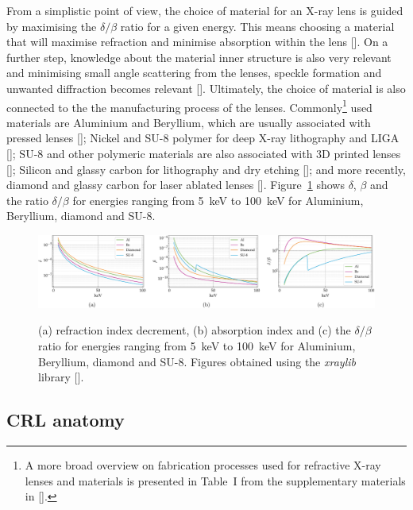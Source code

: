 \begin{refsection}
From a simplistic point of view, the choice of material for an X-ray lens is guided by maximising the $\delta/\beta$ ratio for a given energy. This means choosing a material that will maximise refraction and minimise absorption within the lens [\cite{Serebrennikov2016, Roth2017}]. On a further step, knowledge about the material inner structure is also very relevant and minimising small angle scattering from the lenses, speckle formation and unwanted diffraction becomes relevant [\citeauthor{Roth2014,Chubar2020,Lyatun2020}]. Ultimately, the choice of material is also connected to the the manufacturing process of the lenses. Commonly\footnote{A more broad overview on fabrication processes used for refractive X-ray lenses and materials is presented in Table~I from the supplementary materials in [\cite{Roth2017}].} used materials are Aluminium and Beryllium, which are usually associated with pressed lenses [\cite{refBe,refAl}]; Nickel and SU-8 polymer for deep X-ray lithography and LIGA [\cite{refLIGA}]; SU-8 and other polymeric materials are also associated with 3D printed lenses [\cite{ref3Dprinted}]; Silicon and glassy carbon for lithography and dry etching [\cite{refLithoLens}]; and more recently, diamond and glassy carbon for laser ablated lenses [\cite{refLaserLens}]. Figure~\ref{fig:refractive_index} shows $\delta$, $\beta$ and the ratio $\delta/\beta$ for energies ranging from 5~keV to 100~keV for Aluminium, Beryllium, diamond and SU-8. 

\begin{figure}[t]
    \centering
    {\includegraphics[width=1\linewidth]{figures/ch03/n_lens.pdf}}
    \caption[Index of refraction for common lens materials]{(a) refraction index decrement, (b) absorption index and (c) the $\delta/\beta$ ratio for energies ranging from 5~keV to 100~keV for Aluminium, Beryllium, diamond and SU-8. Figures obtained using the \textit{xraylib} library [\cite{Brunetti2004, Schoonjans2011}].}
    \label{fig:refractive_index}
\end{figure}


\subsection{CRL anatomy}\label{sec:CRL_anatomy}


\end{refsection}
